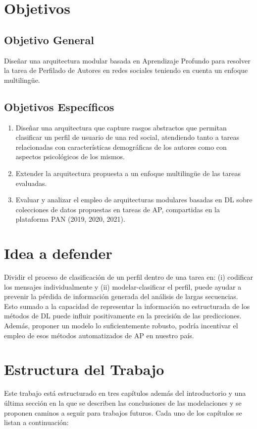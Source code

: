 \section*{Objetivos}
\subsection*{Objetivo General}
Diseñar una arquitectura modular basada en Aprendizaje Profundo para resolver la tarea de Perfilado de Autores en redes sociales teniendo en cuenta un enfoque multilingüe.
\subsection*{Objetivos Específicos}
\begin{enumerate}
	\item Diseñar una arquitectura que capture rasgos abstractos que permitan clasificar un perfil de usuario de una red social, atendiendo tanto a tareas relacionadas con características demográficas de los autores como con aspectos psicológicos de los mismos.
	\item Extender la arquitectura propuesta a un enfoque multilingüe de las tareas evaluadas.
	\item Evaluar y analizar el empleo de arquitecturas modulares basadas en DL sobre colecciones de datos propuestas en tareas de AP, compartidas en la plataforma PAN (2019, 2020, 2021).
\end{enumerate}

\section*{Idea a defender}
Dividir el proceso de clasificación de un perfil dentro de una tarea en: (i) codificar los mensajes individualmente y (ii) modelar-clasificar el perfil, puede ayudar a prevenir la pérdida de información generada del análisis de largas secuencias. Esto sumado a la capacidad de representar la información no estructurada de los métodos de DL puede influir positivamente en la precisión de las predicciones.  Además, proponer un modelo lo suficientemente robusto, podría incentivar el empleo de esos métodos automatizados  de AP en nuestro país.

\section*{Estructura del Trabajo}
Este trabajo está estructurado en tres capítulos además del introductorio y una última sección en la que se describen las conclusiones de las modelaciones y se proponen  caminos a seguir para trabajos futuros. Cada uno de los capítulos se listan a continuación: 

